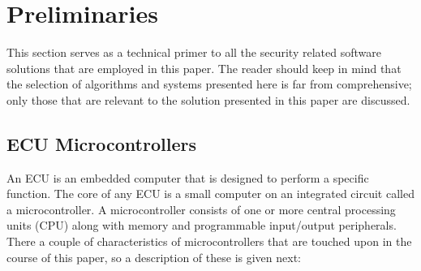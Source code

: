 \section{Preliminaries}
\label{chap:preliminaries}

This section serves as a technical primer to all the security related software solutions that are employed in this paper. The reader should keep in mind that the selection of algorithms and systems presented here is far from comprehensive; only those that are relevant to the solution presented in this paper are discussed.

\subsection{ECU Microcontrollers}
\label{sec:microcontrollers}

An ECU is an embedded computer that is designed to perform a specific function. The core of any ECU is a small computer on an integrated circuit called a microcontroller. A microcontroller consists of one or more central processing units (CPU) along with memory and programmable input/output peripherals. There a couple of characteristics of microcontrollers that are touched upon in the course of this paper, so a description of these is given next:

